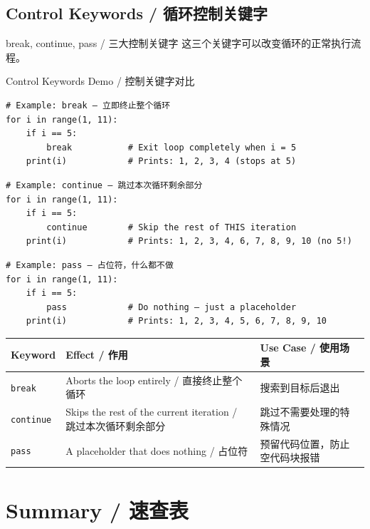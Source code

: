 \documentclass[11pt,a4paper]{report}
\let\oldtexttt\texttt
\renewcommand{\texttt}[1]{\textcolor{mainblue}{\oldtexttt{#1}}}
\begin{document}
\subsection{Control Keywords / 循环控制关键字}

\begin{concept}{break, continue, pass / 三大控制关键字}
    这三个关键字可以改变循环的正常执行流程。
\end{concept}

\begin{examplebox}{Control Keywords Demo / 控制关键字对比}
\begin{lstlisting}
# Example: break — 立即终止整个循环
for i in range(1, 11):
    if i == 5:
        break           # Exit loop completely when i = 5
    print(i)            # Prints: 1, 2, 3, 4 (stops at 5)
\end{lstlisting}

\begin{lstlisting}
# Example: continue — 跳过本次循环剩余部分
for i in range(1, 11):
    if i == 5:
        continue        # Skip the rest of THIS iteration
    print(i)            # Prints: 1, 2, 3, 4, 6, 7, 8, 9, 10 (no 5!)
\end{lstlisting}

\begin{lstlisting}
# Example: pass — 占位符，什么都不做
for i in range(1, 11):
    if i == 5:
        pass            # Do nothing — just a placeholder
    print(i)            # Prints: 1, 2, 3, 4, 5, 6, 7, 8, 9, 10
\end{lstlisting}
\end{examplebox}

\medskip
\centering
\renewcommand{\arraystretch}{1.5}
\begin{tabular}{@{}lll@{}}
\toprule
\textbf{Keyword} & \textbf{Effect / 作用} & \textbf{Use Case / 使用场景} \\ \midrule
\texttt{break}    & Aborts the loop entirely / 直接终止整个循环 & 搜索到目标后退出 \\
\texttt{continue} & Skips the rest of the current iteration / 跳过本次循环剩余部分 & 跳过不需要处理的特殊情况 \\
\texttt{pass}     & A placeholder that does nothing / 占位符 & 预留代码位置，防止空代码块报错 \\ \bottomrule
\end{tabular}
\medskip

\section{Summary / 速查表}
\end{document}
